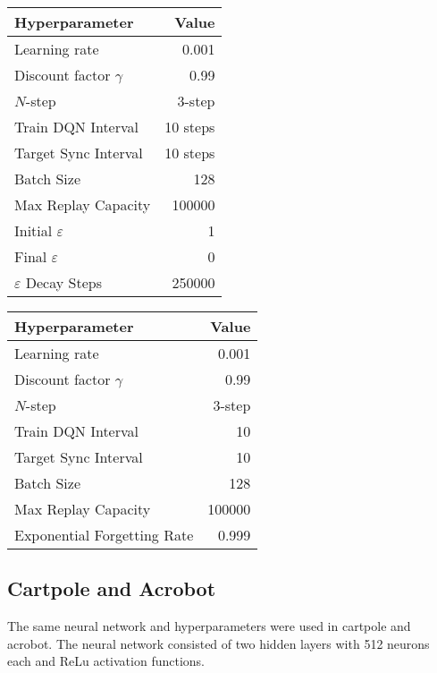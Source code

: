{{\begin{table}[H]
    \centering
    \begin{tabular}{@{}lr@{}}
        \toprule
        Hyperparameter               & Value \\ \midrule
        Learning rate                & 0.001 \\
        Discount factor $\gamma$     & 0.99  \\
        $N$-step                     & 3-step \\
        Train DQN Interval           & 10 steps \\
        Target Sync Interval         & 10 steps \\
        Batch Size                   & 128 \\
        Max Replay Capacity          & 100000 \\ 
        Initial $\varepsilon$        & 1 \\
        Final $\varepsilon$          & 0 \\
        $\varepsilon$ Decay Steps    & 250000 \\ \bottomrule
    \end{tabular}
    \quad
    \begin{tabular}{@{}lr@{}}
        \toprule
        Hyperparameter               & Value \\ \midrule
        Learning rate                & 0.001 \\
        Discount factor $\gamma$     & 0.99  \\
        $N$-step                     & 3-step \\
        Train DQN Interval           & 10 \\
        Target Sync Interval         & 10\\
        Batch Size                   & 128 \\
        Max Replay Capacity          & 100000 \\
        Exponential Forgetting Rate  & 0.999 \\ \bottomrule
    \end{tabular}
\end{table}

\subsection{Cartpole and Acrobot}

The same neural network and hyperparameters were used in cartpole and acrobot. The neural network consisted of two hidden layers with 512 neurons each and ReLu activation functions.

}}

